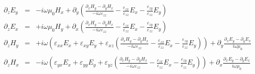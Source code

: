 \documentclass[12pt,a4paper,twoside,openright,BCOR10mm,headsepline,titlepage,abstracton,chapterprefix,final]{scrreprt}
\newcommand\vacuum{0}
\newcommand\scalarEfield{E}
\newcommand\scalarHfield{H}
\newcommand\vacuumpermeability{\scalarpermeability_{\vacuum}}
\newcommand\scalarpermeability{\mu}
\newcommand\scalarpermittivity{\varepsilon}
\begin{document}
\begin{subequations}
  \begin{eqnarray}
   \partial_z \scalarEfield_y &=& 
       - i \omega \vacuumpermeability \scalarHfield_x
       + \partial_y \left( 
        \frac{ \partial_x \scalarHfield_y - \partial_y \scalarHfield_x}
            { -i \omega \scalarpermittivity_{zz} }
        - \frac{\scalarpermittivity_{zx}}{\scalarpermittivity_{zz}} \scalarEfield_x
        - \frac{\scalarpermittivity_{zy}}{\scalarpermittivity_{zz}} \scalarEfield_y
     \right) 
    \\
    \partial_z \scalarEfield_x 
    &=& +i \omega \vacuumpermeability \scalarHfield_y
    + \partial_x \left( 
        \frac{ \partial_x \scalarHfield_y - \partial_y \scalarHfield_x}
            { -i \omega \scalarpermittivity_{zz} }
        - \frac{\scalarpermittivity_{zx}}{\scalarpermittivity_{zz}} \scalarEfield_x
        - \frac{\scalarpermittivity_{zy}}{\scalarpermittivity_{zz}} \scalarEfield_y
    \right)
    \\
    \partial_z \scalarHfield_y &=& +i \omega
      \left( 
        \scalarpermittivity_{xx} \scalarEfield_x + 
        \scalarpermittivity_{xy} \scalarEfield_y +
        \scalarpermittivity_{xz} 
        \left(
            \frac{ \partial_x \scalarHfield_y - \partial_y \scalarHfield_x}
                { -i \omega \scalarpermittivity_{zz} }
            - \frac{\scalarpermittivity_{zx}}{\scalarpermittivity_{zz}} \scalarEfield_x
            - \frac{\scalarpermittivity_{zy}}{\scalarpermittivity_{zz}} \scalarEfield_y
        \right)
      \right)
      + \partial_y \frac{ \partial_x \scalarEfield_y - \partial_y \scalarEfield_x }
          { i \omega \vacuumpermeability } 
    \nonumber\\ \\
    \partial_z \scalarHfield_x &=& -i \omega 
      \left( 
        \scalarpermittivity_{yx} \scalarEfield_x + 
        \scalarpermittivity_{yy} \scalarEfield_y +
        \scalarpermittivity_{yz} 
        \left(
            \frac{ \partial_x \scalarHfield_y - \partial_y \scalarHfield_x}
            { -i \omega \scalarpermittivity_{zz} }
            - \frac{\scalarpermittivity_{zx}}{\scalarpermittivity_{zz}} \scalarEfield_x
            - \frac{\scalarpermittivity_{zy}}{\scalarpermittivity_{zz}} \scalarEfield_y
        \right)
      \right)
      +  \partial_x \frac{ \partial_x \scalarEfield_y - \partial_y \scalarEfield_x }
          { i \omega \vacuumpermeability }
    \nonumber\\
  \end{eqnarray}
\end{subequations}
\end{document}
